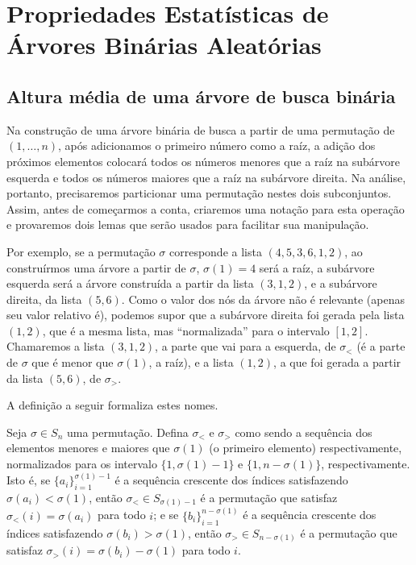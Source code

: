 \section{Propriedades Estatísticas de Árvores Binárias Aleatórias}

\subsection{Altura média de uma árvore de busca binária}

Na construção de uma árvore binária de busca
a partir de uma permutação de $(1, \dots, n)$,
após adicionamos o primeiro número como a raíz,
a adição dos próximos elementos colocará
todos os números menores que a raíz na subárvore esquerda
e todos os números maiores que a raíz na subárvore direita.
Na análise, portanto,
precisaremos particionar uma permutação nestes dois subconjuntos.
Assim,
antes de começarmos a conta,
criaremos uma notação para esta operação
e provaremos dois lemas que serão usados para facilitar sua manipulação.

Por exemplo, se a permutação $\sigma$ corresponde a lista $(4, 5, 3, 6, 1, 2)$,
ao construírmos uma árvore a partir de $\sigma$,
$\sigma(1) = 4$ será a raíz,
a subárvore esquerda será a árvore construída a partir da lista $(3, 1, 2)$,
e a subárvore direita, da lista $(5, 6)$.
Como o valor dos nós da árvore não é relevante (apenas seu valor relativo é),
podemos supor que a subárvore direita foi gerada pela lista $(1, 2)$,
que é a mesma lista,
mas ``normalizada'' para o intervalo $[1, 2]$.
Chamaremos a lista $(3, 1, 2)$,
a parte que vai para a esquerda, de $\sigma_<$
(é a parte de $\sigma$ que é menor que $\sigma(1)$, a raíz),
e a lista $(1, 2)$,
a que foi gerada a partir da lista $(5, 6)$, de $\sigma_>$.

A definição a seguir formaliza estes nomes.

\begin{definition}
    Seja $\sigma \in S_n$ uma permutação.
    Defina $\sigma_<$ e $\sigma_>$
    como sendo a sequência dos elementos menores e maiores que $\sigma(1)$
    (o primeiro elemento)
    respectivamente,
    normalizados para os intervalo $\{1, \sigma(1) - 1\}$ e $\{1, n - \sigma(1)\}$,
    respectivamente.
    Isto é,
    se $\{a_i\}_{i = 1}^{\sigma(1)-1}$ é a sequência crescente
    dos índices satisfazendo $\sigma(a_i) < \sigma(1)$,
    então $\sigma_< \in S_{\sigma(1) - 1}$
    é a permutação que satisfaz $\sigma_<(i) = \sigma(a_i)$ para todo $i$;
    e se $\{b_i\}_{i = 1}^{n - \sigma(1)}$ é a sequência crescente
    dos índices satisfazendo $\sigma(b_i) > \sigma(1)$,
    então $\sigma_> \in S_{n - \sigma(1)}$
    é a permutação que satisfaz $\sigma_>(i) = \sigma(b_i) - \sigma(1)$ para todo $i$.
\end{definition}

